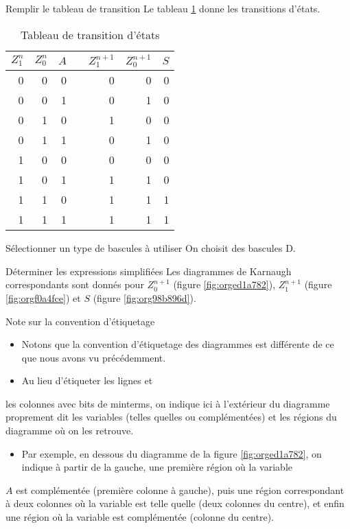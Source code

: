\documentclass[presentation]{beamer}
\begin{document}
\begin{frame}[label={sec:orgf0d4b3e}]{Remplir le tableau de transition}
Le tableau \ref{tab:org98cfa6a} donne les transitions d'états. 

\begin{table}[htbp]
\caption{\label{tab:org98cfa6a}Tableau de transition d'états}
\centering
\begin{tabular}{rrrlrrr}
\(Z_1^n\) & \(Z_0^n\) & \(A\) &  & \(Z_1^{n+1}\) & \(Z_0^{n+1}\) & \(S\)\\[0pt]
\hline
0 & 0 & 0 &  & 0 & 0 & 0\\[0pt]
0 & 0 & 1 &  & 0 & 1 & 0\\[0pt]
0 & 1 & 0 &  & 1 & 0 & 0\\[0pt]
0 & 1 & 1 &  & 0 & 1 & 0\\[0pt]
1 & 0 & 0 &  & 0 & 0 & 0\\[0pt]
1 & 0 & 1 &  & 1 & 1 & 0\\[0pt]
1 & 1 & 0 &  & 1 & 1 & 1\\[0pt]
1 & 1 & 1 &  & 1 & 1 & 1\\[0pt]
\end{tabular}
\end{table}
\end{frame}


\begin{frame}[label={sec:org9029bc3}]{Sélectionner un type de bascules à utiliser}
On choisit des bascules D. 
\end{frame}

\begin{frame}[label={sec:org9471fca}]{Déterminer les expressions simplifiées}
Les diagrammes de Karnaugh correspondants sont donnés pour
\(Z_0^{n+1}\) (figure \ref{fig:orged1a782}), \(Z_1^{n+1}\) (figure
\ref{fig:orgf0a4fce}) et \(S\) (figure \ref{fig:org98b896d}).
\end{frame}

\begin{frame}[label={sec:orge34458c}]{Note sur la convention d'étiquetage}
\begin{itemize}
\item Notons que la convention d'étiquetage des diagrammes est différente
de ce que nous avons vu précédemment.
\item Au lieu d'étiqueter les lignes et
\end{itemize}
les colonnes avec bits de minterms, on indique ici à l'extérieur du
diagramme proprement dit les variables (telles quelles ou
complémentées) et les régions du diagramme où on les retrouve. 

\begin{itemize}
\item Par exemple, en dessous du diagramme de la figure \ref{fig:orged1a782}, on indique à partir de la gauche, une première région où la variable
\end{itemize}
\(A\) est complémentée (première colonne à gauche), puis une région
correspondant à deux colonnes où la variable est telle quelle (deux
colonnes du centre), et enfin une région où la variable est
complémentée (colonne du centre).
\end{frame}
\end{document}
